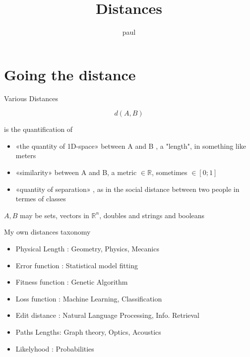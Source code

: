 \documentclass{beamer}
\title{Distances}
\subtitle{}
\date{}
\author{paul}
\begin{document}
\maketitle  

\section{Going the distance} 

\begin{frame}{Various Distances}


$$d(A,B)$$

\begin{scriptsize}

is the quantification of 

\begin{itemize}
\item   «the quantity of 1D-space» between A and B , a \alert{"length"}, in something like meters
\item «similarity» between A and B, a \alert{metric} $\in \mathbb{R}$, sometimes $\in[0;1]$
\item  «quantity of separation» , as in the \alert{social distance} between two people in termes of classes  
\end{itemize}


$A,B$ may be sets, vectors in $\mathbb{R}^n$, doubles and strings and booleans

\end{scriptsize}

\end{frame}


\begin{frame}{My own distances taxonomy}



\begin{itemize}
\item  Physical Length : Geometry, Physics, Mecanics
\item  Error function :  Statistical model fitting 
\item  Fitness function : Genetic Algorithm
\item  Loss function : Machine Learning, Classification 
\item  Edit distance : Natural Language Processing, Info. Retrieval 
\item  Paths Lengths:  Graph theory, Optics, Acoustics
\item  Likelyhood : Probabilities 
\end{itemize}


\end{frame}
\end{document}

